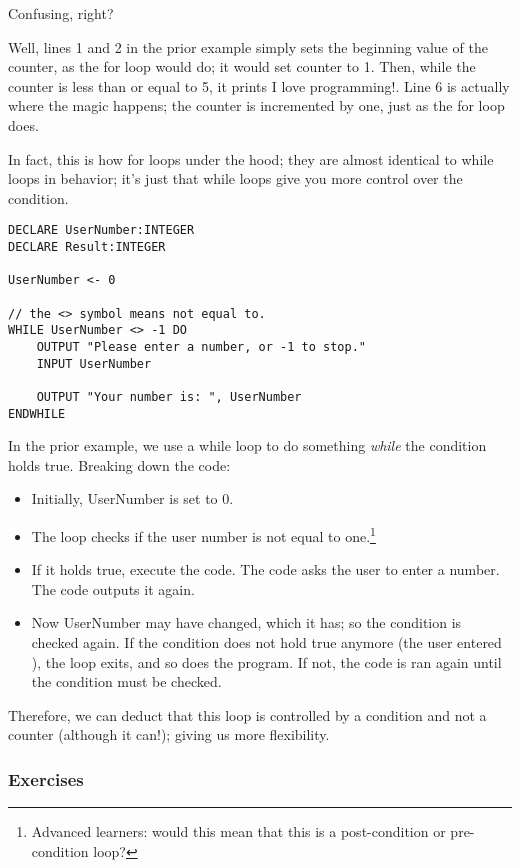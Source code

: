 \documentclass[./main.tex]{subfiles}
\begin{document}
Confusing, right?

Well, lines 1 and 2 in the prior example simply sets the beginning value of the counter, as the for loop would do; it would set counter to 1. Then, while the counter is less than or equal to 5, it prints {\ccmono I love programming!}. Line 6 is actually where the magic happens; the counter is incremented by one, just as the for loop does.

In fact, this is how for loops under the hood; they are almost identical to while loops in behavior; it's just that while loops give you more control over the condition.

\begin{verbatim}
DECLARE UserNumber:INTEGER
DECLARE Result:INTEGER

UserNumber <- 0

// the <> symbol means not equal to.
WHILE UserNumber <> -1 DO 
    OUTPUT "Please enter a number, or -1 to stop."
    INPUT UserNumber

    OUTPUT "Your number is: ", UserNumber
ENDWHILE
\end{verbatim}

In the prior example, we use a while loop to do something \emph{while} the condition holds true. Breaking down the code:

\begin{itemize}
    \item Initially, {\ccmono UserNumber} is set to 0.
    \item The loop checks if the user number is not equal to one.\footnote{Advanced learners: would this mean that this is a post-condition or pre-condition loop?}
    \item If it holds true, execute the code. The code asks the user to enter a number. The code outputs it again.
    \item Now {\ccmono UserNumber} may have changed, which it has; so the condition is checked again. If the condition does not hold true anymore (the user entered {}), the loop exits, and so does the program. If not, the code is ran again until the condition must be checked.
\end{itemize}

Therefore, we can deduct that this loop is controlled by a condition and not a counter (although it can!); giving us more flexibility.

\subsubsection{Exercises}
\label{ex:2_3_1}
\end{document}
